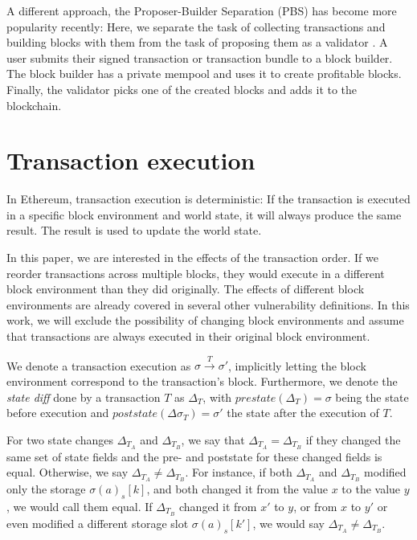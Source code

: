 \documentclass[draft,final]{vutinfth} %
\begin{document}
A different approach, the Proposer-Builder Separation (PBS) has become more popularity recently: Here, we separate the task of collecting transactions and building blocks with them from the task of proposing them as a validator \cite{heimbach_ethereums_2023}. A user submits their signed transaction or transaction bundle to a block builder. The block builder has a private mempool and uses it to create profitable blocks. Finally, the validator picks one of the created blocks and adds it to the blockchain.

\section{Transaction execution}

In Ethereum, transaction execution is deterministic: If the transaction is executed in a specific block environment and world state, it will always produce the same result. The result is used to update the world state.

In this paper, we are interested in the effects of the transaction order. If we reorder transactions across multiple blocks, they would execute in a different block environment than they did originally. The effects of different block environments are already covered in several other vulnerability definitions. In this work, we will exclude the possibility of changing block environments and assume that transactions are always executed in their original block environment.

We denote a transaction execution as $\sigma \xrightarrow{T} \sigma\prime$, implicitly letting the block environment correspond to the transaction's block. Furthermore, we denote the \emph{state diff} done by a transaction $T$ as $\Delta_T$, with $prestate(\Delta_T) = \sigma$ being the state before execution and $poststate(\Delta\sigma_T) = \sigma\prime$ the state after the execution of $T$.

For two state changes $\Delta_{T_A}$ and $\Delta_{T_B}$, we say that $\Delta_{T_A} = \Delta_{T_B}$ if they changed the same set of state fields and the pre- and poststate for these changed fields is equal. Otherwise, we say $\Delta_{T_A} \neq \Delta_{T_B}$. For instance, if both $\Delta_{T_A}$ and $\Delta_{T_B}$ modified only the storage $\sigma(a)_s[k]$, and both changed it from the value $x$ to the value $y$, we would call them equal. If $\Delta_{T_B}$ changed it from $x\prime$ to $y$, or from $x$ to $y\prime$ or even modified a different storage slot $\sigma(a)_s[k\prime]$, we would say $\Delta_{T_A} \neq \Delta_{T_B}$.
\end{document}
